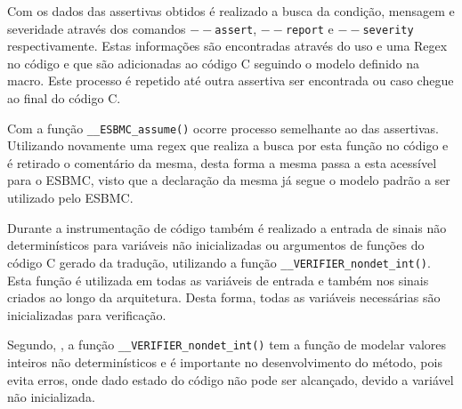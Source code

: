 \par
Com os dados das assertivas obtidos é realizado a busca da condição, mensagem e severidade através dos comandos \texttt{$--$assert}, \texttt{$--$report} e \texttt{$--$severity} respectivamente. Estas informações são encontradas através do uso e uma Regex no código e que são adicionadas ao código C seguindo o modelo definido na macro. Este processo é repetido até outra assertiva ser encontrada ou caso chegue ao final do código C.

\par
Com a função \texttt{\_\_ESBMC\_assume()} ocorre processo semelhante ao das assertivas. Utilizando novamente uma regex que realiza a busca por esta função no código e é retirado o comentário da mesma, desta forma a mesma passa a esta acessível para o ESBMC, visto que a declaração da mesma já segue o modelo padrão a ser utilizado pelo ESBMC.

\par
Durante a instrumentação de código também é realizado a entrada de sinais não determinísticos para variáveis não inicializadas ou argumentos de funções do código C gerado da tradução, utilizando a função \texttt{\_\_VERIFIER\_nondet\_int()}. Esta função é utilizada em todas as variáveis de entrada e também nos sinais criados ao longo da arquitetura. Desta forma, todas as variáveis necessárias são inicializadas para verificação.

\par
Segundo, , a função \texttt{\_\_VERIFIER\_nondet\_int()} tem a função de modelar valores inteiros não determinísticos e é importante no desenvolvimento do método, pois evita erros, onde dado estado do código não pode ser alcançado, devido a variável não inicializada.

